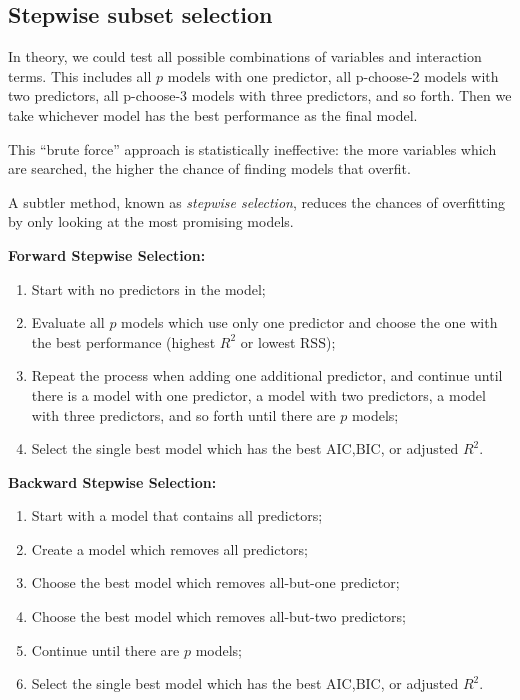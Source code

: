 \documentclass[]{book}
\providecommand{\tightlist}{%
  \setlength{\itemsep}{0pt}\setlength{\parskip}{0pt}}
\begin{document}
\hypertarget{stepwise-subset-selection}{%
\subsection{Stepwise subset selection}\label{stepwise-subset-selection}}

In theory, we could test all possible combinations of variables and interaction terms. This includes all \(p\) models with one predictor, all p-choose-2 models with two predictors, all p-choose-3 models with three predictors, and so forth. Then we take whichever model has the best performance as the final model.

This ``brute force'' approach is statistically ineffective: the more variables which are searched, the higher the chance of finding models that overfit.

A subtler method, known as \emph{stepwise selection}, reduces the chances of overfitting by only looking at the most promising models.

\textbf{Forward Stepwise Selection:}

\begin{enumerate}
\def\labelenumi{\arabic{enumi}.}
\tightlist
\item
  Start with no predictors in the model;
\item
  Evaluate all \(p\) models which use only one predictor and choose the one with the best performance (highest \(R^2\) or lowest \(\text{RSS}\));
\item
  Repeat the process when adding one additional predictor, and continue until there is a model with one predictor, a model with two predictors, a model with three predictors, and so forth until there are \(p\) models;
\item
  Select the single best model which has the best \(\text{AIC}\),\(\text{BIC}\), or adjusted \(R^2\).
\end{enumerate}

\textbf{Backward Stepwise Selection:}

\begin{enumerate}
\def\labelenumi{\arabic{enumi}.}
\tightlist
\item
  Start with a model that contains all predictors;
\item
  Create a model which removes all predictors;
\item
  Choose the best model which removes all-but-one predictor;
\item
  Choose the best model which removes all-but-two predictors;
\item
  Continue until there are \(p\) models;
\item
  Select the single best model which has the best \(\text{AIC}\),\(\text{BIC}\), or adjusted \(R^2\).
\end{enumerate}
\end{document}
